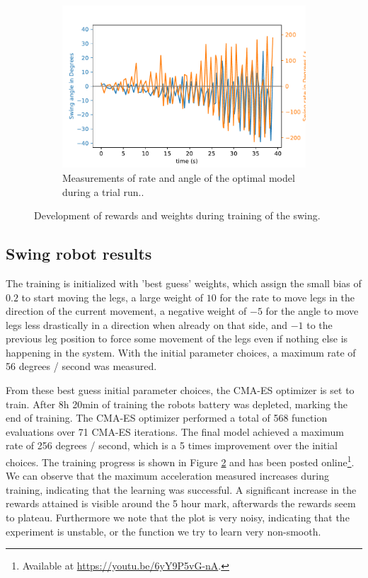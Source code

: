 \documentclass[11pt, a4paper]{article}
\begin{document}
\begin{figure}[ht]
\begin{subfigure}{.48\textwidth}
			\includegraphics[width=1\linewidth]{images/trail_run.pdf}
			\caption{Measurements of rate and angle of the optimal model during a trial run..}
			\label{fig:swing_plot}
		\end{subfigure}%
		\caption{Development of rewards and weights during training of the swing.}
		\label{fig:swing_results}
	\end{figure}
	
	\subsection{Swing robot results}
	The training is initialized with 'best guess' weights, which assign the small bias of $0.2$ to start moving the legs, a large weight of $10$ for the rate to move legs in the direction of the current movement, a negative weight of $-5$ for the angle to move legs less drastically in a direction when already on that side, and $-1$ to the previous leg position to force some movement of the legs even if nothing else is happening in the system. With the initial parameter choices, a maximum rate of 56 degrees / second was measured. 
	
	From these best guess initial parameter choices, the CMA-ES optimizer is set to train. After 8h 20min of training the robots battery was depleted, marking the end of training. The CMA-ES optimizer performed a total of 568 function evaluations over 71 CMA-ES iterations. The final model achieved a maximum rate of 256 degrees / second, which is a 5 times improvement over the initial choices. The training progress is shown in Figure \ref{fig:swing_results} and has been posted online\footnote{Available at \url{https://youtu.be/6yY9P5vG-nA}.}. We can observe that the maximum acceleration measured increases during training, indicating that the learning was successful. A significant increase in the rewards attained is visible around the 5 hour mark, afterwards the rewards seem to plateau. Furthermore we note that the plot is very noisy, indicating that the experiment is unstable, or the function we try to learn very non-smooth.
	
\end{document}
